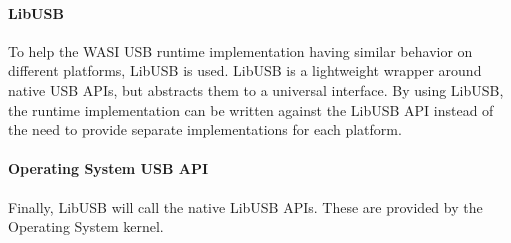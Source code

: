 \paragraph{LibUSB} To help the WASI USB runtime implementation having similar behavior on different platforms, LibUSB is used. LibUSB is a lightweight wrapper around native USB APIs, but abstracts them to a universal interface. By using LibUSB, the runtime implementation can be written against the LibUSB API instead of the need to provide separate implementations for each platform.

\paragraph{Operating System USB API} Finally, LibUSB will call the native LibUSB APIs. These are provided by the Operating System kernel.

